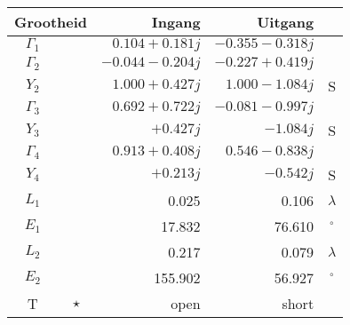 \begin{tabular}{|cc|r|r|c|} 
\hline \multicolumn{2}{|c|}{\textbf{Grootheid}} & \textbf{Ingang} & \textbf{Uitgang} & \\ 
\hline $\Gamma_1$ & \color{blue}{$\star$} & $0.104 +0.181 j$ & $-0.355 -0.318 j$ &  \\ 
\hline $\Gamma_2$ & \color{green}{$\star$} & $-0.044 -0.204 j$ & $-0.227 +0.419 j$ &  \\ 
$Y_2$ & \color{green}{$\star$} & $1.000 +0.427 j$ & $1.000 -1.084 j$ & S \\ 
\hline $\Gamma_3$ & \color{cyan}{$\star$} & $0.692 +0.722 j$ & $-0.081 -0.997 j$ &  \\ 
$Y_3$ & \color{cyan}{$\star$} & $+0.427 j$ & $-1.084 j$ & S \\ 
\hline $\Gamma_4$ & \color{magenta}{$\star$} & $0.913 +0.408 j$ & $0.546 -0.838 j$ &  \\ 
$Y_4$ & \color{magenta}{$\star$} & $+0.213 j$ & $-0.542 j$ & S \\ 
\hline $L_1$ & \color{blue}{\textbf{--}} & 0.025 & 0.106 & ${\lambda}$ \\ 
$E_1$ & \color{blue}{\textbf{--}} & 17.832 & 76.610 & $^{\circ}$ \\ 
\hline $L_2$ & \color{blue}{\textbf{--}} & 0.217 & 0.079 & ${\lambda}$ \\ 
$E_2$ & \color{magenta}{\textbf{--}} & 155.902 & 56.927 & $^{\circ}$ \\ 
\hline T & $\star$ & open & short &  \\ 
\hline \end{tabular} 
